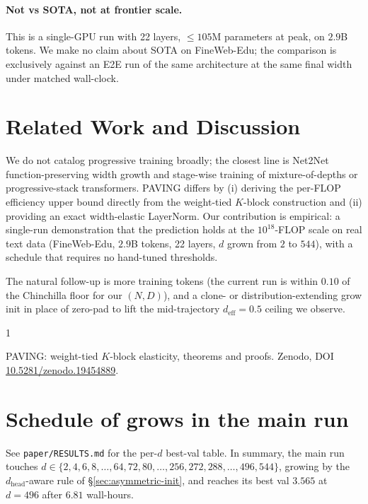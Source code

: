 \documentclass{article}
\begin{document}
\paragraph{Not vs SOTA, not at frontier scale.}
This is a single-GPU run with 22 layers, $\le 105$M parameters at
peak, on $2.9$B tokens.  We make no claim about SOTA on FineWeb-Edu;
the comparison is exclusively against an E2E run of the same
architecture at the same final width under matched wall-clock.

\section{Related Work and Discussion}

We do not catalog progressive training broadly; the closest line is
Net2Net function-preserving width growth and stage-wise training of
mixture-of-depths or progressive-stack transformers.  PAVING differs
by (i) deriving the per-FLOP efficiency upper bound directly from the
weight-tied $K$-block construction and (ii) providing an exact
width-elastic LayerNorm.  Our contribution is empirical: a
single-run demonstration that the prediction holds at the
$10^{18}$-FLOP scale on real text data (FineWeb-Edu, $2.9$B tokens,
22 layers, $d$ grown from $2$ to $544$), with a schedule that
requires no hand-tuned thresholds.

The natural follow-up is more training tokens (the current run is
within $0.10$ of the Chinchilla floor for our $(N, D)$), and a clone-
or distribution-extending grow init in place of zero-pad to lift the
mid-trajectory $d_{\text{eff}}{=}0.5$ ceiling we observe.


\begin{thebibliography}{1}

 PAVING: weight-tied $K$-block elasticity, theorems and proofs.
Zenodo, DOI \href{https://doi.org/10.5281/zenodo.19454889}{10.5281/zenodo.19454889}.

\end{thebibliography}

\appendix

\section{Schedule of grows in the main run}
\label{app:trajectory}
See \texttt{paper/RESULTS.md} for the per-$d$ best-val table.  In
summary, the main run touches $d \in \{2, 4, 6, 8, \ldots, 64, 72,
80, \ldots, 256, 272, 288, \ldots, 496, 544\}$, growing by the
$d_{\text{head}}$-aware rule of \S\ref{sec:asymmetric-init}, and
reaches its best val $3.565$ at $d{=}496$ after $6.81$ wall-hours.
\end{document}
